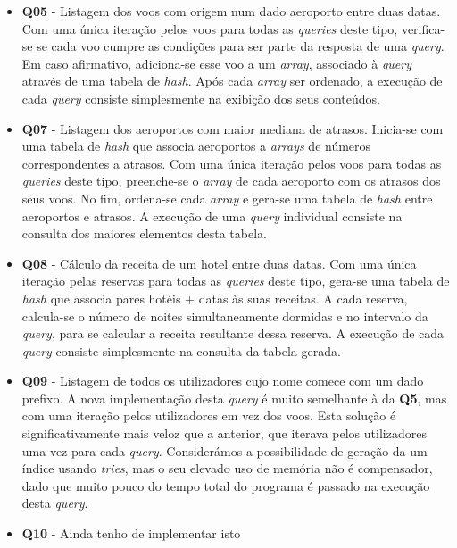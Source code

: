\documentclass[12pt, a4paper]{article}
\begin{document}
\begin{itemize}
    \item \textbf{Q05} - Listagem dos voos com origem num dado aeroporto entre duas datas. Com uma
                         única iteração pelos voos para todas as \emph{queries} deste tipo,
                         verifica-se se cada voo cumpre as condições para ser parte da resposta
                         de uma \emph{query}. Em caso afirmativo, adiciona-se esse voo a um
                         \emph{array}, associado à \emph{query} através de uma tabela de
                         \emph{hash}. Após cada \emph{array} ser ordenado, a execução de cada
                         \emph{query} consiste simplesmente na exibição dos seus conteúdos.

    \item \textbf{Q07} - Listagem dos aeroportos com maior mediana de atrasos. Inicia-se com uma
                         tabela de \emph{hash} que associa aeroportos a \emph{arrays} de números
                         correspondentes a atrasos. Com uma única iteração pelos voos para todas
                         as \emph{queries} deste tipo, preenche-se o \emph{array} de cada aeroporto
                         com os atrasos dos seus voos. No fim, ordena-se cada \emph{array} e gera-se
                         uma tabela de \emph{hash} entre aeroportos e atrasos. A execução de uma
                         \emph{query} individual consiste na consulta dos maiores elementos desta
                         tabela.

    \item \textbf{Q08} - Cálculo da receita de um hotel entre duas datas. Com uma única iteração
                         pelas reservas para todas as \emph{queries} deste tipo, gera-se uma tabela
                         de \emph{hash} que associa pares hotéis + datas às suas receitas. A cada
                         reserva, calcula-se o número de noites simultaneamente dormidas e no
                         intervalo da \emph{query}, para se calcular a receita resultante dessa
                         reserva. A execução de cada \emph{query} consiste simplesmente na consulta
                         da tabela gerada.

    \item \textbf{Q09} - Listagem de todos os utilizadores cujo nome comece com um dado prefixo. A
                         nova implementação desta \emph{query} é muito semelhante à da \textbf{Q5},
                         mas com uma iteração pelos utilizadores em vez dos voos. Esta solução é
                         significativamente mais veloz que a anterior, que iterava pelos
                         utilizadores uma vez para cada \emph{query}. Considerámos a possibilidade
                         de geração da um índice usando \emph{tries}, mas o seu elevado uso de
                         memória não é compensador, dado que muito pouco do tempo total do programa
                         é passado na execução desta \emph{query}.

    \item \textbf{Q10} - {\color{red}Ainda tenho de implementar isto}
\end{itemize}
\end{document}

